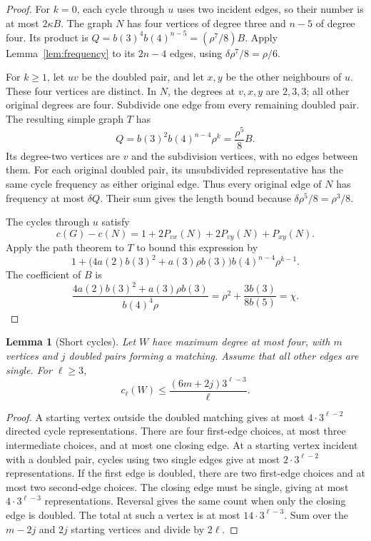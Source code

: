 \documentclass[11pt]{article}
\newtheorem{lemma}[theorem]{Lemma}
\begin{document}
\begin{proof}
For $k=0$, each cycle through $u$ uses two incident edges, so their number is at most $2\kappa B$.
The graph $N$ has four vertices of degree three and $n-5$ of degree four.
Its product is $Q=b(3)^4b(4)^{n-5}=(\rho^7/8)B$.
Apply Lemma~\ref{lem:frequency} to its $2n-4$ edges, using $\delta\rho^7/8=\rho/6$.

For $k\ge1$, let $uv$ be the doubled pair, and let $x,y$ be the other neighbours of $u$.
These four vertices are distinct.
In $N$, the degrees at $v,x,y$ are $2,3,3$; all other original degrees are four.
Subdivide one edge from every remaining doubled pair.
The resulting simple graph $T$ has
\[
 Q=b(3)^2b(4)^{n-4}\rho^k=\frac{\rho^5}{8}B.
\]
Its degree-two vertices are $v$ and the subdivision vertices, with no edges between them.
For each original doubled pair, its unsubdivided representative has the same cycle frequency as either original edge.
Thus every original edge of $N$ has frequency at most $\delta Q$.
Their sum gives the length bound because $\delta\rho^5/8=\rho^3/8$.

The cycles through $u$ satisfy
\[
 c(G)-c(N)=1+2P_{vx}(N)+2P_{vy}(N)+P_{xy}(N).
\]
Apply the path theorem to $T$ to bound this expression by
\[
 1+\bigl(4a(2)b(3)^2+a(3)\rho b(3)\bigr)b(4)^{n-4}\rho^{k-1}.
\]
The coefficient of $B$ is
\[
 \frac{4a(2)b(3)^2+a(3)\rho b(3)}{b(4)^4\rho}
 =\rho^2+\frac{3b(3)}{8b(5)}=\chi.
\]
\end{proof}

\begin{lemma}[Short cycles]\label{lem:short}
Let $W$ have maximum degree at most four, with $m$ vertices and $j$ doubled pairs forming a matching.
Assume that all other edges are single.
For $\ell\ge3$,
\[
 c_\ell(W)\le\frac{(6m+2j)3^{\ell-3}}\ell.
\]
\end{lemma}

\begin{proof}
A starting vertex outside the doubled matching gives at most $4\cdot3^{\ell-2}$ directed cycle representations.
There are four first-edge choices, at most three intermediate choices, and at most one closing edge.
At a starting vertex incident with a doubled pair, cycles using two single edges give at most $2\cdot3^{\ell-2}$ representations.
If the first edge is doubled, there are two first-edge choices and at most two second-edge choices.
The closing edge must be single, giving at most $4\cdot3^{\ell-3}$ representations.
Reversal gives the same count when only the closing edge is doubled.
The total at such a vertex is at most $14\cdot3^{\ell-3}$.
Sum over the $m-2j$ and $2j$ starting vertices and divide by $2\ell$.
\end{proof}
\end{document}
